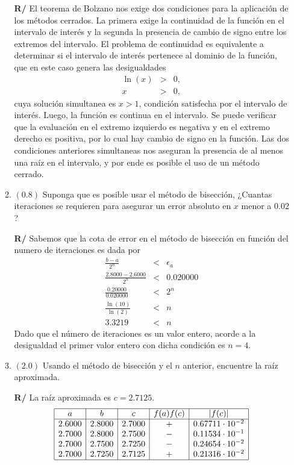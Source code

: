 \documentclass[12pt]{article}
\begin{document}
\begin{enumerate}[leftmargin=*,widest=9]
\begin{enumerate}[label=\alph*]
\textbf{R/} El teorema de Bolzano nos exige dos condiciones para la aplicación de los métodos cerrados. La primera exige la continuidad de la función en el intervalo de interés y la segunda la presencia de cambio de signo entre los extremos del intervalo.
El problema de continuidad es equivalente a determinar si el intervalo de interés pertenece al dominio de la función, que en este caso genera las desigualdades
\begin{eqnarray*}
\ln(x) & > & 0, \\
x & > & 0,
\end{eqnarray*}
cuya solución simultanea es \( x > 1 \), condición satisfecha por el intervalo de interés. Luego, la función es continua en el intervalo.
Se puede verificar que la evaluación en el extremo izquierdo es negativa y en el extremo derecho es positiva, por lo cual hay cambio de signo en la función.
Las dos condiciones anteriores simultaneas nos aseguran la presencia de al menos una raíz en el intervalo, y por ende es posible el uso de un método cerrado.
   \item \((0.8)\) Suponga que es posible usar el método de bisección, ¿Cuantas iteraciones se requieren para asegurar un error absoluto en \(x\) menor a \(0.02\) ?

\textbf{R/} Sabemos que la cota de error en el método de bisección en función del numero de iteraciones es dada por 
   \begin{eqnarray*}
   \frac{b - a}{2^n} &<& \epsilon_a \\
   \frac{2.8000 - 2.6000}{2^n} &<& 0.020000 \\
   \frac{0.20000}{0.020000} &<& 2^n \\
   \frac{\ln(10)}{\ln(2)} &<& n \\
   3.3219 &<& n
   \end{eqnarray*}
   Dado que el número de iteraciones es un valor entero, acorde a la desigualdad el primer valor entero con dicha condición es \(n=4\).
   \item \((2.0)\) Usando el método de bisección y el \(n\) anterior, encuentre la raíz aproximada.

\textbf{R/} La raíz aproximada es \(c = 2.7125 \).
\begin{equation*}
     \begin{array}{|c|c|c|c|c|}
   \hline
   a & b & c & f(a)f(c) & |f(c)| \\
   \hline
   2.6000 & 2.8000 & 2.7000 & + & 0.67711 \cdot 10^{-2} \\
   2.7000 & 2.8000 & 2.7500 & - & 0.11534 \cdot 10^{-1} \\
   2.7000 & 2.7500 & 2.7250 & - & 0.24654 \cdot 10^{-2} \\
   2.7000 & 2.7250 & 2.7125 & + & 0.21316 \cdot 10^{-2} \\
   \hline
   \end{array}
\end{equation*}   
    \end{enumerate}
  \end{enumerate}
\end{document}

